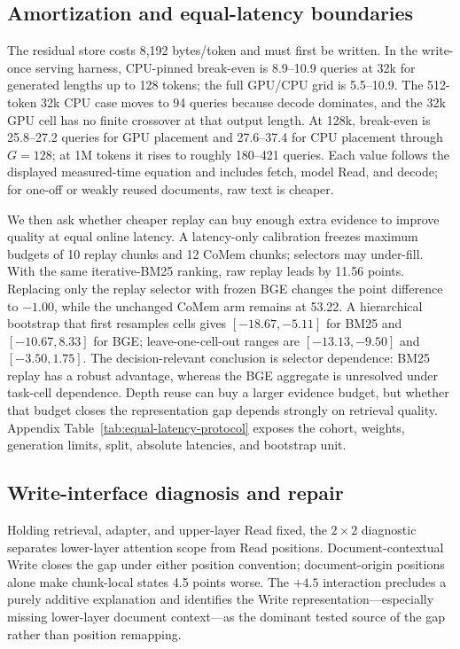\subsection{Amortization and equal-latency boundaries}


The residual store costs 8,192 bytes/token and must first be written. In the
write-once serving harness, CPU-pinned break-even is 8.9--10.9 queries at 32k
for generated lengths up to 128 tokens; the full GPU/CPU grid is 5.5--10.9.
The 512-token 32k CPU case moves to 94 queries because decode dominates, and
the 32k GPU cell has no finite crossover at that output length. At 128k,
break-even is 25.8--27.2 queries for GPU placement and 27.6--37.4 for CPU
placement through $G{=}128$; at 1M tokens it rises to roughly 180--421 queries.
Each value follows the displayed measured-time equation and includes fetch,
model Read, and decode; for one-off or weakly reused documents, raw text is
cheaper.



We then ask whether cheaper replay can buy enough extra evidence to improve
quality at equal online latency. A latency-only calibration freezes maximum
budgets of 10 replay chunks and 12 CoMem chunks; selectors may under-fill.
With the same iterative-BM25 ranking, raw replay
leads by 11.56 points. Replacing only the replay selector with frozen BGE changes
the point difference to $-1.00$, while the unchanged CoMem arm remains at
53.22. A hierarchical bootstrap that first resamples cells gives
$[-18.67,-5.11]$ for BM25 and $[-10.67,8.33]$ for BGE; leave-one-cell-out
ranges are $[-13.13,-9.50]$ and $[-3.50,1.75]$. The decision-relevant conclusion is selector dependence: BM25 replay has a
robust advantage, whereas the BGE aggregate is unresolved under task-cell
dependence. Depth reuse can buy a larger evidence budget, but whether that
budget closes the representation gap depends strongly on retrieval quality.
Appendix Table~\ref{tab:equal-latency-protocol} exposes the cohort, weights,
generation limits, split, absolute latencies, and bootstrap unit.

\subsection{Write-interface diagnosis and repair}



Holding retrieval, adapter, and upper-layer Read fixed, the $2{\times}2$
diagnostic separates lower-layer attention scope from Read positions.
Document-contextual Write closes the gap under either position convention;
document-origin positions alone make chunk-local states 4.5 points worse. The $+4.5$ interaction precludes a purely additive explanation and identifies
the Write representation---especially missing lower-layer document context---as
the dominant tested source of the gap rather than position remapping.

